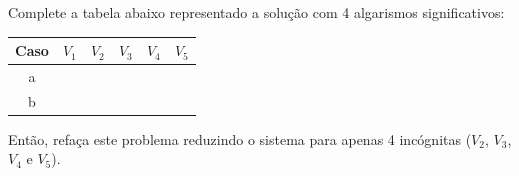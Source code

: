 \begin{exer}
Complete a tabela abaixo representado a solução com 4 algarismos significativos:

\begin{center}
\begin{tabular}{|c|c|c|c|c|c|}
\hline
Caso & $V_1$ & $V_2$ & $V_3$ & $V_4$ & $V_5$\\
\hline
a & ~\hspace{40pt}~& ~\hspace{40pt}~& ~\hspace{40pt}~& ~\hspace{40pt}~& ~\hspace{40pt}~\\
\hline
b & & & & & \\
\hline
\end{tabular}
\end{center}

Então, refaça este problema reduzindo o sistema para apenas 4 incógnitas ($V_2$, $V_3$, $V_4$ e $V_5$).
\end{exer}
\ifisscilab
